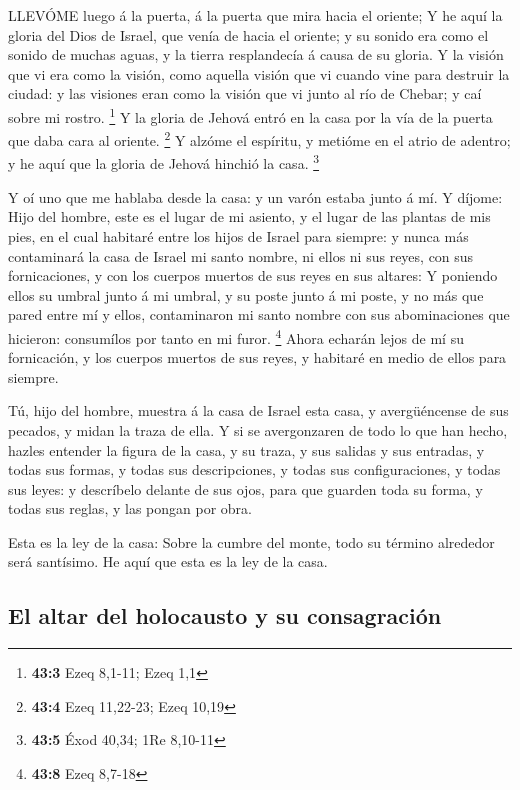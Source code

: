  LLEVÓME luego á la puerta, á la puerta que mira hacia el
oriente;  Y he aquí la gloria del Dios de Israel, que venía
de hacia el oriente; y su sonido era como el sonido de muchas aguas, y
la tierra resplandecía á causa de su gloria.  Y la visión
que vi era como la visión, como aquella visión que vi cuando vine para
destruir la ciudad: y las visiones eran como la visión que vi junto al
río de Chebar; y caí sobre mi rostro. \footnote{\textbf{43:3} Ezeq
  8,1-11; Ezeq 1,1}  Y la gloria de Jehová entró en la casa
por la vía de la puerta que daba cara al oriente. \footnote{\textbf{43:4}
  Ezeq 11,22-23; Ezeq 10,19}  Y alzóme el espíritu, y
metióme en el atrio de adentro; y he aquí que la gloria de Jehová
hinchió la casa. \footnote{\textbf{43:5} Éxod 40,34; 1Re 8,10-11}

 Y oí uno que me hablaba desde la casa: y un varón estaba
junto á mí.  Y díjome: Hijo del hombre, este es el lugar de
mi asiento, y el lugar de las plantas de mis pies, en el cual habitaré
entre los hijos de Israel para siempre: y nunca más contaminará la casa
de Israel mi santo nombre, ni ellos ni sus reyes, con sus fornicaciones,
y con los cuerpos muertos de sus reyes en sus altares:  Y
poniendo ellos su umbral junto á mi umbral, y su poste junto á mi poste,
y no más que pared entre mí y ellos, contaminaron mi santo nombre con
sus abominaciones que hicieron: consumílos por tanto en mi furor.
\footnote{\textbf{43:8} Ezeq 8,7-18}  Ahora echarán lejos de
mí su fornicación, y los cuerpos muertos de sus reyes, y habitaré en
medio de ellos para siempre.

 Tú, hijo del hombre, muestra á la casa de Israel esta
casa, y avergüéncense de sus pecados, y midan la traza de ella.
 Y si se avergonzaren de todo lo que han hecho, hazles
entender la figura de la casa, y su traza, y sus salidas y sus entradas,
y todas sus formas, y todas sus descripciones, y todas sus
configuraciones, y todas sus leyes: y descríbelo delante de sus ojos,
para que guarden toda su forma, y todas sus reglas, y las pongan por
obra.

 Esta es la ley de la casa: Sobre la cumbre del monte, todo
su término alrededor será santísimo. He aquí que esta es la ley de la
casa.

\hypertarget{el-altar-del-holocausto-y-su-consagraciuxf3n}{%
\subsection{El altar del holocausto y su
consagración}\label{el-altar-del-holocausto-y-su-consagraciuxf3n}}

